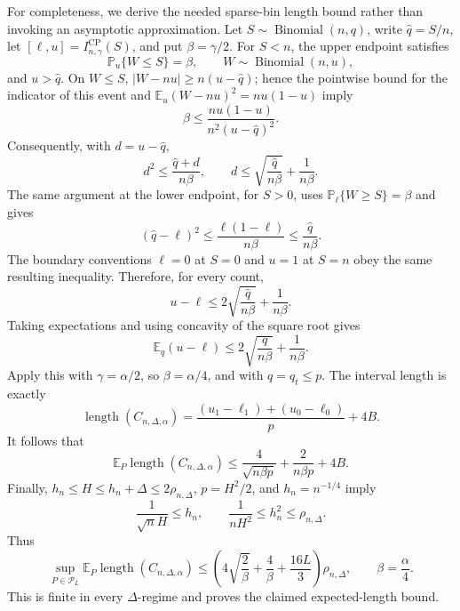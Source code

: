 For completeness, we derive the needed sparse-bin length bound rather than invoking an asymptotic approximation.  Let \(S\sim\operatorname{Binomial}(n,q)\), write \(\widehat q=S/n\), let \([\ell,u]=I^{\mathrm{CP}}_{n,\gamma}(S)\), and put \(\beta=\gamma/2\).  For \(S<n\), the upper endpoint satisfies
\[
 \mathbb P_u\{W\le S\}=\beta,
 \qquad W\sim\operatorname{Binomial}(n,u),
\]
and \(u>\widehat q\).  On \(W\le S\), \(|W-nu|\ge n(u-\widehat q)\); hence the pointwise bound for the indicator of this event and \(\mathbb E_u(W-nu)^2=nu(1-u)\) imply
\[
 \beta\le\frac{nu(1-u)}{n^2(u-\widehat q)^2}.
\]
Consequently, with \(d=u-\widehat q\),
\[
 d^2\le\frac{\widehat q+d}{n\beta},
 \qquad
 d\le\sqrt{\frac{\widehat q}{n\beta}}+\frac1{n\beta}.
\]
The same argument at the lower endpoint, for \(S>0\), uses \(\mathbb P_\ell\{W\ge S\}=\beta\) and gives
\[
 (\widehat q-\ell)^2\le\frac{\ell(1-\ell)}{n\beta}
 \le\frac{\widehat q}{n\beta}.
\]
The boundary conventions \(\ell=0\) at \(S=0\) and \(u=1\) at \(S=n\) obey the same resulting inequality.  Therefore, for every count,
\[
 u-\ell\le2\sqrt{\frac{\widehat q}{n\beta}}+\frac1{n\beta}.
\]
Taking expectations and using concavity of the square root gives
\[
 \mathbb E_q(u-\ell)
 \le2\sqrt{\frac{q}{n\beta}}+\frac1{n\beta}.
\]
Apply this with \(\gamma=\alpha/2\), so \(\beta=\alpha/4\), and with \(q=q_t\le p\).  The interval length is exactly
\[
 \operatorname{length}(C_{n,\Delta,\alpha})
 =\frac{(u_1-\ell_1)+(u_0-\ell_0)}p+4B.
\]
It follows that
\[
 \mathbb E_P\operatorname{length}(C_{n,\Delta,\alpha})
 \le\frac4{\sqrt{n\beta p}}+\frac2{n\beta p}+4B.
\]
Finally, \(h_n\le H\le h_n+\Delta\le2\rho_{n,\Delta}\), \(p=H^2/2\), and \(h_n=n^{-1/4}\) imply
\[
 \frac1{\sqrt n H}\le h_n,
 \qquad
 \frac1{nH^2}\le h_n^2\le\rho_{n,\Delta}.
\]
Thus
\[
 \sup_{P\in\mathcal P_L}\mathbb E_P\operatorname{length}(C_{n,\Delta,\alpha})
 \le\left(4\sqrt{\frac2\beta}+\frac4\beta+\frac{16L}{3}\right)\rho_{n,\Delta},
 \qquad \beta=\frac\alpha4.
\]
This is finite in every \(\Delta\)-regime and proves the claimed expected-length bound.
